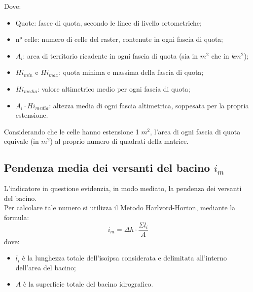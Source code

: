 Dove:
\begin{itemize}
    \item Quote: fasce di quota, secondo le linee di livello ortometriche;
    \item n° celle: numero di celle del raster, contenute in ogni fascia di quota;
    \item $A_i$: area di territorio ricadente in ogni fascia di quota (sia in $m^2$ che in $km^2$);
    \item $Hi_{min}$ e $Hi_{max}$: quota minima e massima della fascia di quota;
    \item $Hi_{media}$: valore altimetrico medio per ogni fascia di quota;
    \item $A_i \cdot Hi_{media}$: altezza media di ogni fascia altimetrica, soppesata per la propria estensione.
\end{itemize}
Considerando che le celle hanno estensione 1 $m^2$, l'area di ogni fascia di quota equivale (in $m^2$) al proprio numero di quadrati della matrice.

\subsection{Pendenza media dei versanti del bacino $i_m$}
L'indicatore in questione evidenzia, in modo mediato, la pendenza dei versanti del bacino.\\
Per calcolare tale numero si utilizza il Metodo Harlvord-Horton, mediante la formula:
\begin{equation}
    i_m = \Delta h \cdot \frac{\Sigma l_i}{A}
\end{equation}
dove: 
\begin{itemize}
 \item $l_i$ è la lunghezza totale dell'isoipsa considerata e delimitata all'interno dell'area del bacino;
 \item $A$ è la superficie totale del bacino idrografico.
\end{itemize}

